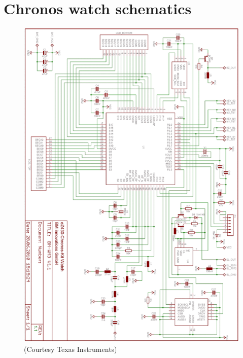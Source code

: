 


\appendix
\chapter{Chronos watch schematics}
\label{appendix:watch_schematics}

\begin{figure}[h]
  \centering
  \includegraphics[width=1.0\textwidth]{img/watch_schematics.png}
  \caption{(Courtesy Texas Instruments)}
\end{figure}


